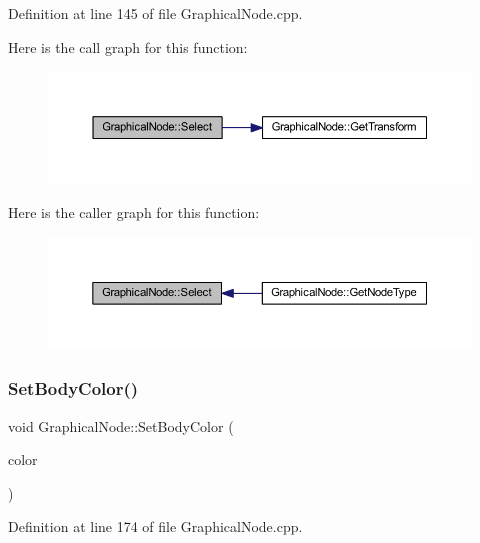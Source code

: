 Definition at line 145 of file Graphical\+Node.\+cpp.

Here is the call graph for this function\+:
\nopagebreak
\begin{figure}[H]
\begin{center}
\leavevmode
\includegraphics[width=350pt]{class_graphical_node_ac73e20f3d4c5cca556e0140ef558f6a4_cgraph}
\end{center}
\end{figure}
Here is the caller graph for this function\+:
\nopagebreak
\begin{figure}[H]
\begin{center}
\leavevmode
\includegraphics[width=350pt]{class_graphical_node_ac73e20f3d4c5cca556e0140ef558f6a4_icgraph}
\end{center}
\end{figure}
\mbox{\label{class_graphical_node_ae0cbf2cfe00306e2cfc610c5eb4cb89b}} 
\subsubsection{\texorpdfstring{Set\+Body\+Color()}{SetBodyColor()}}
{\footnotesize\ttfamily void Graphical\+Node\+::\+Set\+Body\+Color (\begin{DoxyParamCaption}\item[{const wx\+Color \&}]{color }\end{DoxyParamCaption})}



Definition at line 174 of file Graphical\+Node.\+cpp.

